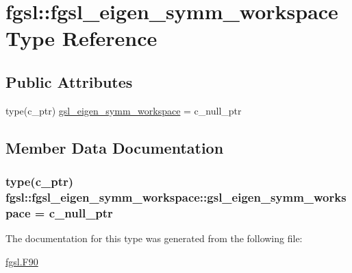 \hypertarget{structfgsl_1_1fgsl__eigen__symm__workspace}{\section{fgsl\-:\-:fgsl\-\_\-eigen\-\_\-symm\-\_\-workspace Type Reference}
\label{structfgsl_1_1fgsl__eigen__symm__workspace}
}
\subsection*{Public Attributes}
\begin{DoxyCompactItemize}
\item 
type(c\-\_\-ptr) \hyperlink{structfgsl_1_1fgsl__eigen__symm__workspace_a42f5fa8f0e6cd50086df8035c7134bcc}{gsl\-\_\-eigen\-\_\-symm\-\_\-workspace} = c\-\_\-null\-\_\-ptr
\end{DoxyCompactItemize}


\subsection{Member Data Documentation}
\hypertarget{structfgsl_1_1fgsl__eigen__symm__workspace_a42f5fa8f0e6cd50086df8035c7134bcc}{
\subsubsection[{gsl\-\_\-eigen\-\_\-symm\-\_\-workspace}]{\setlength{\rightskip}{0pt plus 5cm}type(c\-\_\-ptr) fgsl\-::fgsl\-\_\-eigen\-\_\-symm\-\_\-workspace\-::gsl\-\_\-eigen\-\_\-symm\-\_\-workspace = c\-\_\-null\-\_\-ptr}}\label{structfgsl_1_1fgsl__eigen__symm__workspace_a42f5fa8f0e6cd50086df8035c7134bcc}


The documentation for this type was generated from the following file\-:\begin{DoxyCompactItemize}
\item 
\hyperlink{fgsl_8F90}{fgsl.\-F90}\end{DoxyCompactItemize}
